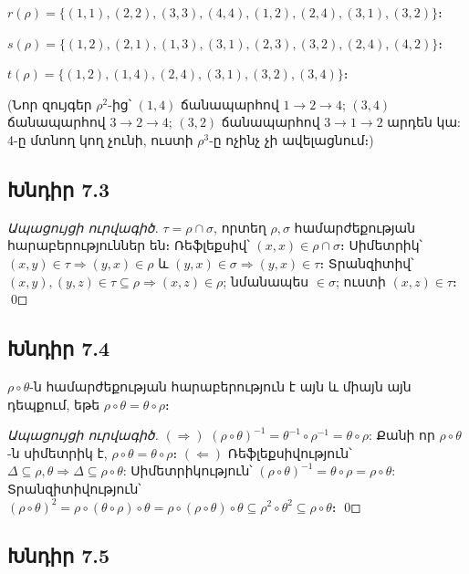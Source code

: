 $\boxed{r(\rho)=\{(1,1),(2,2),(3,3),(4,4),(1,2),(2,4),(3,1),(3,2)\}}$։

$\boxed{s(\rho)=\{(1,2),(2,1),(1,3),(3,1),(2,3),(3,2),(2,4),(4,2)\}}$։

$\boxed{t(\rho)=\{(1,2),(1,4),(2,4),(3,1),(3,2),(3,4)\}}$։

(Նոր զույգեր $\rho^2$-ից՝ $(1,4)$ ճանապարհով $1\!\to\!2\!\to\!4$; $(3,4)$ ճանապարհով $3\!\to\!2\!\to\!4$; $(3,2)$ ճանապարհով $3\!\to\!1\!\to\!2$ արդեն կա: 4-ը մտնող կող չունի, ուստի $\rho^3$-ը ոչինչ չի ավելացնում։)


\subsection*{Խնդիր 7.3}

\emph{Ապացույցի ուրվագիծ.} $\tau=\rho\cap\sigma$, որտեղ $\rho,\sigma$ համարժեքության հարաբերություններ են։
Ռեֆլեքսիվ՝ $(x,x)\in\rho\cap\sigma$։
Սիմետրիկ՝ $(x,y)\in\tau\Rightarrow(y,x)\in\rho$ և $(y,x)\in\sigma\Rightarrow(y,x)\in\tau$։
Տրանզիտիվ՝ $(x,y),(y,z)\in\tau\subseteq\rho\Rightarrow(x,z)\in\rho$; նմանապես $\in\sigma$; ուստի $(x,z)\in\tau$։ \qed


\subsection*{Խնդիր 7.4}

$\rho\circ\theta$-ն համարժեքության հարաբերություն է այն և միայն այն դեպքում, եթե $\rho\circ\theta=\theta\circ\rho$։

\emph{Ապացույցի ուրվագիծ.}
$(\Rightarrow)$ $(\rho\circ\theta)^{-1}=\theta^{-1}\circ\rho^{-1}=\theta\circ\rho$: Քանի որ $\rho\circ\theta$-ն սիմետրիկ է, $\rho\circ\theta=\theta\circ\rho$։
$(\Leftarrow)$ Ռեֆլեքսիվություն՝ $\Delta\subseteq\rho,\theta\Rightarrow\Delta\subseteq\rho\circ\theta$: Սիմետրիկություն՝ $(\rho\circ\theta)^{-1}=\theta\circ\rho=\rho\circ\theta$: Տրանզիտիվություն՝ $(\rho\circ\theta)^2=\rho\circ(\theta\circ\rho)\circ\theta =\rho\circ(\rho\circ\theta)\circ\theta\subseteq\rho^2\circ\theta^2\subseteq\rho\circ\theta$։ \qed


\subsection*{Խնդիր 7.5}

